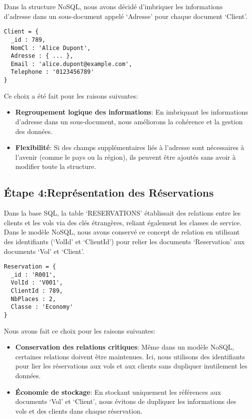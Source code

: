 Dans la structure NoSQL, nous avons décidé d'imbriquer les informations d'adresse dans un sous-document appelé `Adresse' pour chaque document `Client'.

\begin{verbatim}
Client = {
  _id : 789,
  NomCl : 'Alice Dupont',
  Adresse : { ... },
  Email : 'alice.dupont@example.com',
  Telephone : '0123456789'
}
\end{verbatim}

Ce choix a été fait pour les raisons suivantes:
\begin{itemize}
  \item \textbf{Regroupement logique des informations}: En imbriquant les informations d'adresse dans un sous-document, nous améliorons la cohérence et la gestion des données.
  \item \textbf{Flexibilité}: Si des champs supplémentaires liés à l’adresse sont nécessaires à l’avenir (comme le pays ou la région), ils peuvent être ajoutés sans avoir à modifier toute la structure.
\end{itemize}

\subsection{Étape 4:Représentation des Réservations}

Dans la base SQL, la table `RESERVATIONS' établissait des relations entre les clients et les vols via des clés étrangères, reliant également les classes de service. Dans le modèle NoSQL, nous avons conservé ce concept de relation en utilisant des identifiants (`VolId' et `ClientId') pour relier les documents `Reservation' aux documents `Vol' et `Client'.

\begin{verbatim}
Reservation = {
  _id : 'R001',
  VolId : 'V001',
  ClientId : 789,
  NbPlaces : 2,
  Classe : 'Economy'
}
\end{verbatim}

Nous avons fait ce choix pour les raisons suivantes:
\begin{itemize}
  \item \textbf{Conservation des relations critiques}: Même dans un modèle NoSQL, certaines relations doivent être maintenues. Ici, nous utilisons des identifiants pour lier les réservations aux vols et aux clients sans dupliquer inutilement les données.
  \item \textbf{Économie de stockage}: En stockant uniquement les références aux documents `Vol' et `Client', nous évitons de dupliquer les informations des vols et des clients dans chaque réservation.
\end{itemize}

